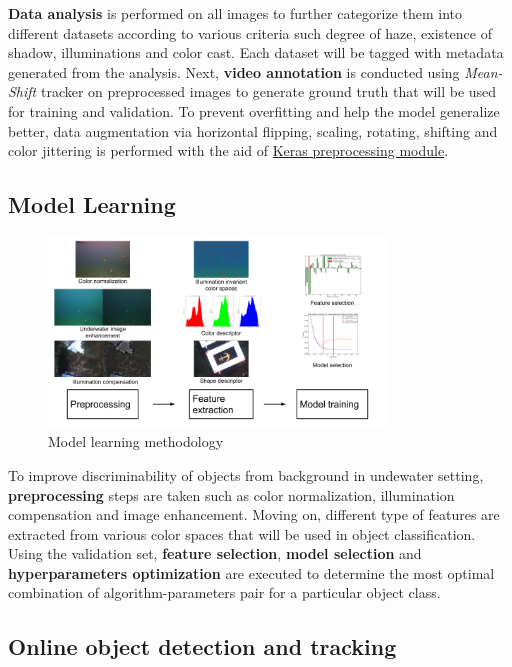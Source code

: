 \documentclass[hyp]{socreport}
\begin{document}
\textbf{Data analysis} is performed on all images to further categorize them into
different datasets according to various criteria such degree of haze, existence
of shadow, illuminations and color cast. Each dataset will be tagged with
metadata generated from the analysis. Next, \textbf{video annotation} is
conducted using \textit{Mean-Shift} tracker on preprocessed images to generate
ground truth that will be used for training and validation. To prevent
overfitting and help the model generalize better, data augmentation via
horizontal flipping, scaling, rotating, shifting and color jittering is
performed with the aid of \href{https://keras.io/preprocessing/image/}{Keras
  preprocessing module}.

\subsection{Model Learning}

\begin{figure}[H]
\centering
  \includegraphics[width=0.8\textwidth, height=0.3\textheight]{training_method.png}
  \caption{Model learning methodology}
  \label{fig:training_methodology}
\end{figure}

To improve discriminability of objects from background in undewater setting,
\textbf{preprocessing} steps are taken such as color normalization, illumination
compensation and image enhancement. Moving on, different type of features are
extracted from various color spaces that will be used in object classification.
Using the validation set, \textbf{feature selection}, \textbf{model selection}
and \textbf{hyperparameters optimization} are executed to determine the most
optimal combination of algorithm-parameters pair for a particular object class.

\subsection{Online object detection and tracking}
\end{document}
